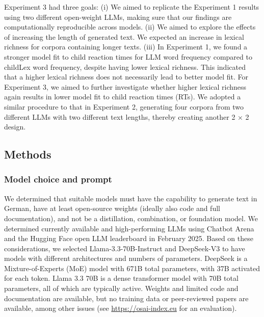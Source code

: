 \documentclass[manuscript]{stjour}
\begin{document}
Experiment 3 had three goals: (i) We aimed to replicate the Experiment 1 results using two different open-weight LLMs, making sure that our findings are computationally reproducible across models. (ii) We aimed to explore the effects of increasing the length of generated text. We expected an increase in lexical richness for corpora containing longer texts. (iii) In Experiment 1, we found a stronger model fit to child reaction times for LLM word frequency compared to childLex word frequency, despite having lower lexical richness. This indicated that a higher lexical richness does not necessarily lead to better model fit. For Experiment 3, we aimed to further investigate whether higher lexical richness again results in lower model fit to child reaction times (RTs). We adopted a similar procedure to that in Experiment 2, generating four corpora from two different LLMs with two different text lengths, thereby creating another 2 × 2 design. 


\subsection{Methods}

\subsubsection{Model choice and prompt}

We determined that suitable models must have the capability to generate text in German, have at least open-source weights (ideally also code and full documentation), and not be a distillation, combination, or foundation model. We determined currently available and high-performing LLMs using Chatbot Arena \citep{chiang_chatbot_2024} and the Hugging Face open LLM leaderboard \citep{fourrier_open_2024} in February 2025. Based on these considerations, we selected Llama-3.3-70B-Instruct \citep{grattafiori_llama_2024} and DeepSeek-V3 \citep{liu_deepseek-v3_2024} to have models with different architectures and numbers of parameters. DeepSeek is a Mixture-of-Experts (MoE) model with 671B total parameters, with 37B activated for each token. Llama 3.3 70B is a dense transformer model with 70B total parameters, all of which are typically active. Weights and limited code and documentation are available, but no training data or peer-reviewed papers are available, among other issues (see \url{https://osai-index.eu} for an evaluation).  
\end{document}

